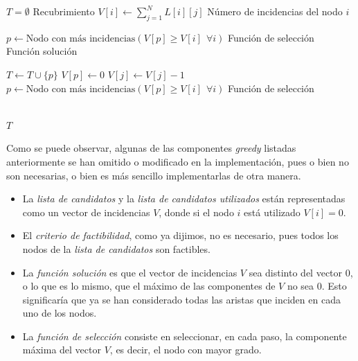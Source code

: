 \documentclass[11pt]{article}
\begin{document}
\begin{algorithm}
\begin{algorithmic}


    \State $T = \emptyset$ \Comment Recubrimiento
        \State $\displaystyle V[i] \gets \sum_{j=1}^N L[i][j]$ \Comment Número de incidencias del nodo $i$
    \EndFor

    \State $p \gets \text{Nodo con más incidencias} \left( V[p] \ge V[i] \ \ \forall i \right)$ \Comment Función de selección \\

     \Comment Función solución

        \State $T \gets T \cup \{p\}$
        \State $V[p] \gets 0$
                \State $V[j] \gets V[j]-1$
            \EndIf
        \EndFor
        \State $p \gets \text{Nodo con más incidencias} \left( V[p] \ge V[i] \ \ \forall i \right)$ \Comment Función de selección

    \EndWhile \\
    \State \Return $T$
\EndFunction
\end{algorithmic}
\end{algorithm}

Como se puede observar, algunas de las componentes \textit{greedy} listadas anteriormente se han omitido o modificado en la implementación, pues o bien no son necesarias, o bien es más sencillo implementarlas de otra manera.

\begin{itemize}
	\item La \textit{lista de candidatos} y la \textit{lista de candidatos utilizados} están representadas como un vector de incidencias $V$, donde si el nodo $i$ está utilizado $V[i] = 0$.
	\item El \textit{criterio de factibilidad}, como ya dijimos, no es necesario, pues todos los nodos de la \textit{lista de candidatos} son factibles.
	\item La \textit{función solución} es que el vector de incidencias $V$ sea distinto del vector $0$, o lo que es lo mismo, que el máximo de las componentes de $V$ no sea $0$. Esto significaría que ya se han considerado todas las aristas que inciden en cada uno de los nodos.
	\item La \textit{función de selección} consiste en seleccionar, en cada paso, la componente máxima del vector $V$, es decir, el nodo con mayor grado.
\end{itemize}
\end{document}
